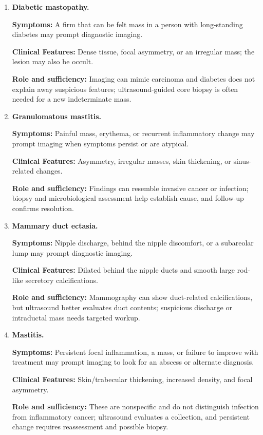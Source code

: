 \begin{enumerate}[leftmargin=*,itemsep=0.45em,topsep=0.4em]
\item \textbf{Diabetic mastopathy.}\par\noindent\textbf{Symptoms:} A firm that can be felt mass in a person with long-standing diabetes may prompt diagnostic imaging.\par\noindent\textbf{Clinical Features:} Dense tissue, focal asymmetry, or an irregular mass; the lesion may also be occult.\par\noindent\textbf{Role and sufficiency:} Imaging can mimic carcinoma and diabetes does not explain away suspicious features; ultrasound-guided core biopsy is often needed for a new indeterminate mass.
\item \textbf{Granulomatous mastitis.}\par\noindent\textbf{Symptoms:} Painful mass, erythema, or recurrent inflammatory change may prompt imaging when symptoms persist or are atypical.\par\noindent\textbf{Clinical Features:} Asymmetry, irregular masses, skin thickening, or sinus-related changes.\par\noindent\textbf{Role and sufficiency:} Findings can resemble invasive cancer or infection; biopsy and microbiological assessment help establish cause, and follow-up confirms resolution.
\item \textbf{Mammary duct ectasia.}\par\noindent\textbf{Symptoms:} Nipple discharge, behind the nipple discomfort, or a subareolar lump may prompt diagnostic imaging.\par\noindent\textbf{Clinical Features:} Dilated behind the nipple ducts and smooth large rod-like secretory calcifications.\par\noindent\textbf{Role and sufficiency:} Mammography can show duct-related calcifications, but ultrasound better evaluates duct contents; suspicious discharge or intraductal mass needs targeted workup.
\item \textbf{Mastitis.}\par\noindent\textbf{Symptoms:} Persistent focal inflammation, a mass, or failure to improve with treatment may prompt imaging to look for an abscess or alternate diagnosis.\par\noindent\textbf{Clinical Features:} Skin/trabecular thickening, increased density, and focal asymmetry.\par\noindent\textbf{Role and sufficiency:} These are nonspecific and do not distinguish infection from inflammatory cancer; ultrasound evaluates a collection, and persistent change requires reassessment and possible biopsy.

\end{enumerate}
